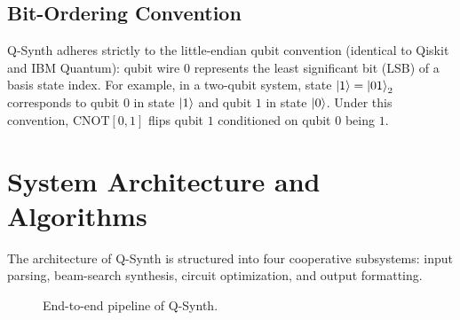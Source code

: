 \documentclass[11pt]{article}
\newcommand{\CNOT}{\mathrm{CNOT}}
\begin{document}
\subsection{Bit-Ordering Convention}
Q-Synth adheres strictly to the little-endian qubit convention (identical to Qiskit and IBM Quantum):
qubit wire $0$ represents the least significant bit (LSB) of a basis state index. For example, in a two-qubit system, state $\ket{1} = \ket{01}_2$ corresponds to qubit $0$ in state $\ket{1}$ and qubit $1$ in state $\ket{0}$. Under this convention, $\CNOT[0, 1]$ flips qubit $1$ conditioned on qubit $0$ being $1$.

\section{System Architecture and Algorithms}
The architecture of Q-Synth is structured into four cooperative subsystems: input parsing, beam-search synthesis, circuit optimization, and output formatting.

\begin{figure}[htbp]
\centering
{}
\caption{End-to-end pipeline of Q-Synth.}
\label{fig:pipeline_arch}
\end{figure}
\end{document}
